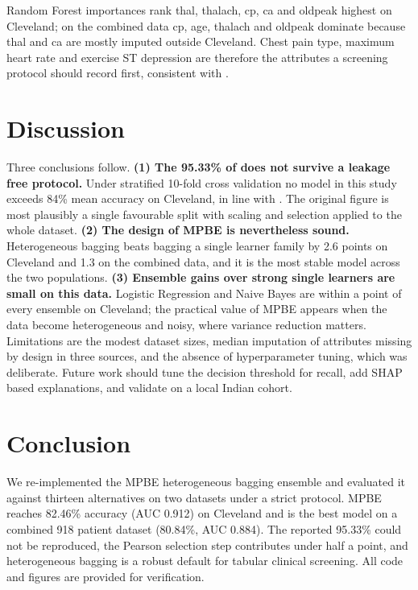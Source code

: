 \documentclass[conference,a4paper,10pt]{IEEEtran}
\begin{document}
Random Forest importances rank thal, thalach, cp, ca and oldpeak highest on Cleveland; on the combined data cp, age, thalach and oldpeak dominate because thal and ca are mostly imputed outside Cleveland. Chest pain type, maximum heart rate and exercise ST depression are therefore the attributes a screening protocol should record first, consistent with \cite{r15,r16}.

\section{Discussion}
Three conclusions follow. \textbf{(1) The 95.33\% of \cite{r1} does not survive a leakage free protocol.} Under stratified 10-fold cross validation no model in this study exceeds 84\% mean accuracy on Cleveland, in line with \cite{r8,r9,r10,r21}. The original figure is most plausibly a single favourable split with scaling and selection applied to the whole dataset. \textbf{(2) The design of MPBE is nevertheless sound.} Heterogeneous bagging beats bagging a single learner family by 2.6 points on Cleveland and 1.3 on the combined data, and it is the most stable model across the two populations. \textbf{(3) Ensemble gains over strong single learners are small on this data.} Logistic Regression and Naive Bayes are within a point of every ensemble on Cleveland; the practical value of MPBE appears when the data become heterogeneous and noisy, where variance reduction matters. Limitations are the modest dataset sizes, median imputation of attributes missing by design in three sources, and the absence of hyperparameter tuning, which was deliberate. Future work should tune the decision threshold for recall, add SHAP based explanations, and validate on a local Indian cohort.

\section{Conclusion}
We re-implemented the MPBE heterogeneous bagging ensemble and evaluated it against thirteen alternatives on two datasets under a strict protocol. MPBE reaches 82.46\% accuracy (AUC 0.912) on Cleveland and is the best model on a combined 918 patient dataset (80.84\%, AUC 0.884). The reported 95.33\% could not be reproduced, the Pearson selection step contributes under half a point, and heterogeneous bagging is a robust default for tabular clinical screening. All code and figures are provided for verification.
\end{document}
